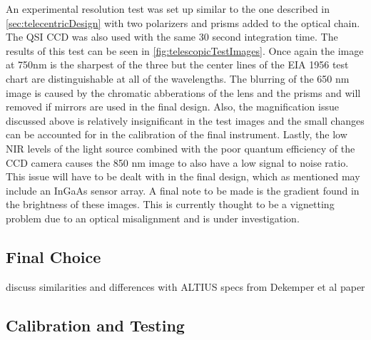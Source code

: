 An experimental resolution test was set up similar to the one described in \autoref{sec:telecentricDesign} with two polarizers and prisms added to the optical chain. The QSI CCD was also used with the same 30 second integration time. The results of this test can be seen in \autoref{fig:telescopicTestImages}. Once again the image at 750nm is the sharpest of the three but the center lines of the EIA 1956 test chart are distinguishable at all of the wavelengths. The blurring of the 650 nm image is caused by the chromatic abberations of the lens and the prisms and will removed if mirrors are used in the final design. Also, the magnification issue discussed above is relatively insignificant in the test images and the small changes can be accounted for in the calibration of the final instrument. Lastly, the low NIR levels of the light source combined with the poor quantum efficiency of the CCD camera causes the 850 nm image to also have a low signal to noise ratio. This issue will have to be dealt with in the final design, which as mentioned may include an InGaAs sensor array. A final note to be made is the gradient found in the brightness of these images. This is currently thought to be a vignetting problem due to an optical misalignment and is under investigation.


\subsection{Final Choice}

discuss similarities and differences with ALTIUS specs from Dekemper et al paper

\subsection{Calibration and Testing}
